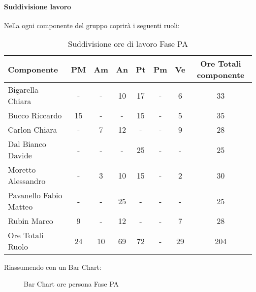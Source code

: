 			\paragraph{Suddivisione lavoro}
				Nella  ogni componente del gruppo \groupname{} coprirà i seguenti ruoli:
				\begin{table}
					\begin{center}
						\begin{tabular}{| l | c | c | c | c | c | c | c |}
							\hline
							Componente 					& PM		& Am		 	& An 	& Pt 		& Pm 		& Ve 		& Ore Totali componente \\ \hline
							
							Bigarella Chiara 			& - 		& - 		& 10 		& 17 		& - 		& 6 		& 33 \\
							Bucco Riccardo 				& 15 		& - 		& - 		& 15 		& -			& 5 		& 35 \\
							Carlon Chiara	 			& - 		& 7 		& 12 		& - 		& - 		& 9 		& 28 \\
							Dal Bianco Davide 			& - 		& - 		& - 		& 25 		& - 		& - 		& 25 \\
							Moretto Alessandro 			& - 		& 3 		& 10 		& 15 		& - 		& 2 		& 30 \\
							Pavanello Fabio Matteo	 	& - 		& - 		& 25 		& - 		& - 		& - 		& 25 \\
							Rubin Marco					& 9 		& - 		& 12 		& - 		& - 		& 7 		& 28 \\ \hline \hline
							
							Ore Totali Ruolo 			& 24 		& 10 		& 69 		& 72 		& - 		& 29 		& 204\\ \hline
						\end{tabular}
					\end{center}
					\caption{Suddivisione ore di lavoro Fase PA}
				\end{table}
				Riassumendo con un Bar Chart:
				\begin{figure}\centering
					\caption{Bar Chart ore persona Fase PA}
				\end{figure}
